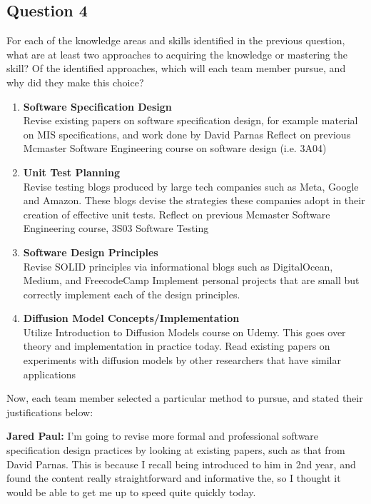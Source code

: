 \documentclass[12pt, titlepage]{article}
\begin{document}
\subsection{Question 4}
For each of the knowledge areas and skills identified in the previous
question, what are at least two approaches to acquiring the knowledge or
mastering the skill?  Of the identified approaches, which will each team
member pursue, and why did they make this choice?\\

\begin{enumerate}
  \item \textbf{Software Specification Design}\\
    Revise existing papers on software specification design, for example material on MIS specifications, and work done by David Parnas
    Reflect on previous Mcmaster Software Engineering course on software design (i.e. 3A04)

  \item \textbf{Unit Test Planning}\\
    Revise testing blogs produced by large tech companies such as Meta, Google and Amazon. These blogs devise the strategies these companies adopt in their creation of effective unit tests.
    Reflect on previous Mcmaster Software Engineering course, 3S03 Software Testing

  \item \textbf{Software Design Principles}\\
    Revise SOLID principles via informational blogs such as DigitalOcean, Medium, and FreecodeCamp
    Implement personal projects that are small but correctly implement each of the design principles.

  \item \textbf{Diffusion Model Concepts/Implementation}\\
    Utilize Introduction to Diffusion Models course on Udemy. This goes over theory and implementation in practice today.
    Read existing papers on experiments with diffusion models by other researchers that have similar applications
\end{enumerate}

Now, each team member selected a particular method to pursue, and stated their justifications below:

\textbf{Jared Paul:} I’m going to revise more formal and professional software specification design practices by looking at existing papers, such as that from David Parnas. This is because I recall being introduced to him in 2nd year, and found the content really straightforward and informative the, so I thought it would be able to get me up to speed quite quickly today.
\end{document}
